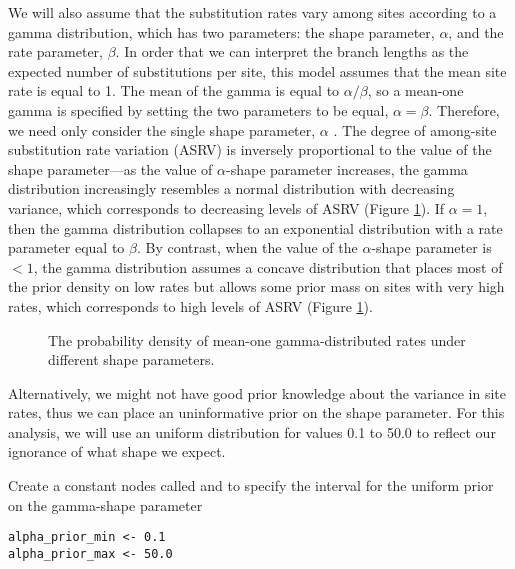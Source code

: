 We will also assume that the substitution rates vary among sites according to a gamma distribution, which has two parameters: the shape parameter, $\alpha$, and the rate parameter, $\beta$. 
In order that we can interpret the branch lengths as the expected number of substitutions per site, this model assumes that the mean site rate is equal to 1.
The mean of the gamma is equal to $\alpha/\beta$, so a mean-one gamma is specified by setting the two parameters to be equal, $\alpha=\beta$.
Therefore, we need only consider the single shape parameter, $\alpha$ \citep{Yang1994a}. 
The degree of among-site substitution rate variation (ASRV) is inversely proportional to the value of the shape parameter---as the value of $\alpha$-shape parameter increases, the gamma distribution increasingly resembles a normal distribution with decreasing variance, which corresponds to decreasing levels of ASRV (Figure \ref{asrhGammaFig}).
If $\alpha = 1$, then the gamma distribution collapses to an exponential distribution with a rate parameter equal to $\beta$.
By contrast, when the value of the $\alpha$-shape parameter is $< 1$, the gamma distribution assumes a concave distribution that places most of the prior density on low rates but allows some prior mass on sites with very high rates, which corresponds to high levels of ASRV (Figure \ref{asrhGammaFig}).

\begin{figure}[h]
\centering
{}
\caption{\small The probability density of mean-one gamma-distributed rates under different shape parameters.}
\label{asrhGammaFig}
\end{figure}


Alternatively, we might not have good prior knowledge about the variance in site rates, thus we can place an uninformative prior on the shape parameter.
For this analysis, we will use an uniform distribution for values 0.1 to 50.0 to reflect our ignorance of what shape we expect.

Create a constant nodes called  and  to specify the interval for the uniform prior on the gamma-shape parameter
{\tt\begin{snugshade*}
\begin{lstlisting}
alpha_prior_min <- 0.1
alpha_prior_max <- 50.0
\end{lstlisting}
\end{snugshade*}}

